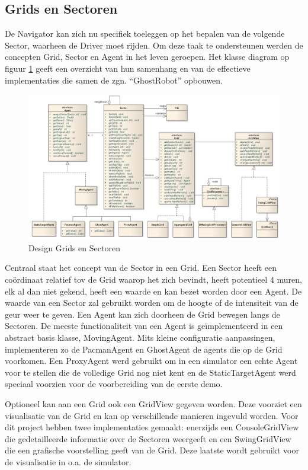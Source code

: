 \documentclass[12pt,a4paper]{report}
\begin{document}
\subsection{Grids en Sectoren}

De Navigator kan zich nu specifiek toeleggen op het bepalen van de volgende Sector, waarheen de Driver moet rijden. Om deze taak te ondersteunen werden de concepten Grid, Sector en Agent in het leven geroepen. Het klasse diagram op figuur \ref{uml:grids-sectoren} geeft een overzicht van hun samenhang en van de effectieve implementaties die samen de zgn. ``GhostRobot'' opbouwen.

\begin{figure}[htbp]
  \centering
  \includegraphics[width=200mm, angle=90]{resources/grids-sectors.png}
  \caption{Design Grids en Sectoren}
  \label{uml:grids-sectoren}
\end{figure}

Centraal staat het concept van de Sector in een Grid. Een Sector heeft een co\"ordinaat relatief tov de Grid waarop het zich bevindt, heeft potentieel 4 muren, elk al dan niet gekend, heeft een waarde en kan bezet worden door een Agent. De waarde van een Sector zal gebruikt worden om de hoogte of de intensiteit van de geur weer te geven. Een Agent kan zich doorheen de Grid bewegen langs de Sectoren. De meeste functionaliteit van een Agent is ge\"implementeerd in een abstract basis klasse, MovingAgent. Mits kleine configuratie aanpassingen, implementeren zo de PacmanAgent en GhostAgent de agents die op de Grid voorkomen. Een ProxyAgent werd gebruikt om in een simulator een echte Agent voor te stellen die de volledige Grid nog niet kent en de StaticTargetAgent werd speciaal voorzien voor de voorbereiding van de eerste demo.

Optioneel kan aan een Grid ook een GridView gegeven worden. Deze voorziet een visualisatie van de Grid en kan op verschillende manieren ingevuld worden. Voor dit project hebben twee implementaties gemaakt: enerzijds een ConsoleGridView die gedetailleerde informatie over de Sectoren weergeeft en een SwingGridView die een grafische voorstelling geeft van de Grid. Deze laatste wordt gebruikt voor de visualisatie in o.a. de simulator.
\end{document}
